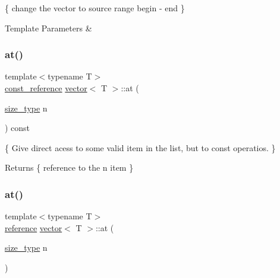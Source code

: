\{ change the vector to source range begin -\/ end \} 


\begin{DoxyTemplParams}{Template Parameters}
{\em } & \\
\hline
\end{DoxyTemplParams}
\mbox{\label{classvector_a447aea9f88801ad5005b9fbd4c0aaf71}} 
\subsubsection{\texorpdfstring{at()}{at()}\hspace{0.1cm}{\footnotesize\ttfamily [1/2]}}
{\footnotesize\ttfamily template$<$typename T$>$ \\
\hyperlink{classvector_aad263433b4072dfbc26ace0df6441960}{const\+\_\+reference} \hyperlink{classvector}{vector}$<$ T $>$\+::at (\begin{DoxyParamCaption}\item[{\hyperlink{classvector_a4d06f3ade0c2ac023b7a7edb85d9d1ef}{size\+\_\+type}}]{n }\end{DoxyParamCaption}) const\hspace{0.3cm}{\ttfamily [inline]}}



\{ Give direct acess to some valid item in the list, but to const operatios. \} 

\begin{DoxyReturn}{Returns}
\{ reference to the n item \} 
\end{DoxyReturn}
\mbox{\label{classvector_ad72a222490a6dcb55d0d22287b8f6f51}} 
\subsubsection{\texorpdfstring{at()}{at()}\hspace{0.1cm}{\footnotesize\ttfamily [2/2]}}
{\footnotesize\ttfamily template$<$typename T$>$ \\
\hyperlink{classvector_a068ad546247a09ea9dd025658ad69348}{reference} \hyperlink{classvector}{vector}$<$ T $>$\+::at (\begin{DoxyParamCaption}\item[{\hyperlink{classvector_a4d06f3ade0c2ac023b7a7edb85d9d1ef}{size\+\_\+type}}]{n }\end{DoxyParamCaption})\hspace{0.3cm}{\ttfamily [inline]}}



